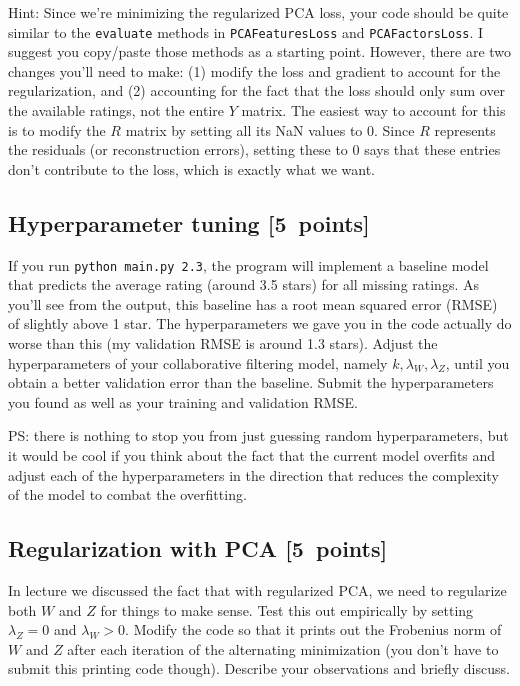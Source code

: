 \documentclass{article}
\newcommand{\blu}[1]{{\textcolor{blu}{#1}}}
\let\ask\blu
\newcommand\pts[1]{\textcolor{pointscolour}{[#1~points]}}
\begin{document}
Hint: Since we're minimizing the regularized PCA loss, your code should be quite similar to the \texttt{evaluate} methods in \texttt{PCAFeaturesLoss} and \texttt{PCAFactorsLoss}. I suggest you copy/paste those methods as a starting point. However, there are two changes you'll need to make: (1) modify the loss and gradient to account for the regularization, and (2) accounting for the fact that the loss should only sum over the available ratings, not the entire $Y$ matrix. The easiest way to account for this is to modify the $R$ matrix by setting all its NaN values to 0. Since $R$ represents the residuals (or reconstruction errors), setting these to 0 says that these entries don't contribute to the loss, which is exactly what we want.



\subsection{Hyperparameter tuning \pts{5}}
If you run \texttt{python main.py 2.3}, the program will implement a baseline model that predicts the average rating (around 3.5 stars) for all missing ratings.
As you'll see from the output, this baseline has a root mean squared error (RMSE) of slightly above 1 star. The hyperparameters we gave you in the code actually do worse than this (my validation RMSE is around 1.3 stars). \ask{Adjust the hyperparameters of your collaborative filtering model, namely $k,\lambda_W,\lambda_Z$, until you obtain a better validation error than the baseline. Submit the hyperparameters you found as well as your training and validation RMSE.}

PS: there is nothing to stop you from just guessing random hyperparameters, but it would be cool if you think about the fact that the current model overfits and adjust each of the hyperparameters in the direction that reduces the complexity of the model to combat the overfitting.


\subsection{Regularization with PCA \pts{5}}

In lecture we discussed the fact that with regularized PCA, we need to regularize both $W$ and $Z$ for things to make sense. Test this out empirically by setting $\lambda_Z=0$ and $\lambda_W>0$. Modify the code so that it prints out the Frobenius norm of $W$ and $Z$ after each iteration of the alternating minimization (you don't have to submit this printing code though). \ask{Describe your observations and briefly discuss.}
\end{document}
